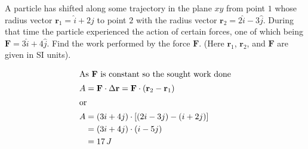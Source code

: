 \item A particle has shifted along some trajectory in the plane $xy$ from point $1$ whose radius vector $\mathbf{r}_1 = \hat{i} + 2\hat{j}$ to point $2$ with the radius vector $\mathbf{r}_2 = 2\hat{i} - 3\hat{j}$. During that time the particle experienced the action of certain forces, one of which being $\mathbf{F} = 3\hat{i} + 4\hat{j}$. Find the work performed by the force $\mathbf{F}$. (Here $\mathbf{r}_1$, $\mathbf{r}_2$, and $\mathbf{F}$ are given in SI units).
\begin{solution}
    \begin{align*}
        \intertext{As \(\mathbf{F}\) is constant so the sought work done}
        A &= \mathbf{F} \cdot \Delta \mathbf{r} = \mathbf{F} \cdot (\mathbf{r}_2 - \mathbf{r}_1)\\
        \intertext{or}
        A &= (3i + 4j) \cdot [(2i - 3j) - (i + 2j)]\\
          &= (3i + 4j) \cdot (i - 5j)\\
          &= 17\, J
    \end{align*}
\end{solution}